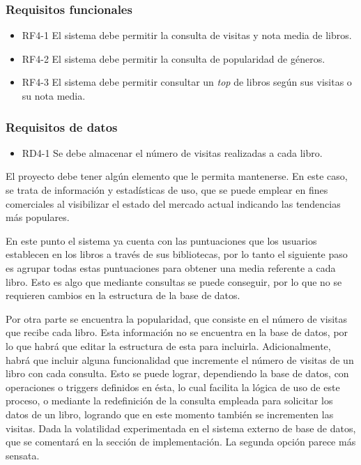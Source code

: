 \subsubsection{Requisitos funcionales}
\begin{itemize}
    \item RF4-1 El sistema debe permitir la consulta de visitas y nota media de libros.
    \item RF4-2 El sistema debe permitir la consulta de popularidad de géneros.
    \item RF4-3 El sistema debe permitir consultar un \textit{top} de libros según sus visitas o su nota media.
\end{itemize}

\subsubsection{Requisitos de datos}
\begin{itemize}
    \item RD4-1 Se debe almacenar el número de visitas realizadas a cada libro.
\end{itemize}

El proyecto debe tener algún elemento que le permita mantenerse. En este caso, se trata de información y estadísticas de uso, que se puede emplear en fines comerciales al visibilizar el estado del mercado actual indicando las tendencias más populares.

En este punto el sistema ya cuenta con las puntuaciones que los usuarios establecen en los libros a través de sus bibliotecas, por lo tanto el siguiente paso es agrupar todas estas puntuaciones para obtener una media referente a cada libro. Esto es algo que mediante consultas se puede conseguir, por lo que no se requieren cambios en la estructura de la base de datos.

Por otra parte se encuentra la popularidad, que consiste en el número de visitas que recibe cada libro. Esta información no se encuentra en la base de datos, por lo que habrá que editar la estructura de esta para incluirla. Adicionalmente, habrá que incluir alguna funcionalidad que incremente el número de visitas de un libro con cada consulta. Esto se puede lograr, dependiendo la base de datos, con operaciones o triggers definidos en ésta, lo cual facilita la lógica de uso de este proceso, o mediante la redefinición de la consulta empleada para solicitar los datos de un libro, logrando que en este momento también se incrementen las visitas. Dada la volatilidad experimentada en el sistema externo de base de datos, que se comentará en la sección de implementación. La segunda opción parece más sensata.

